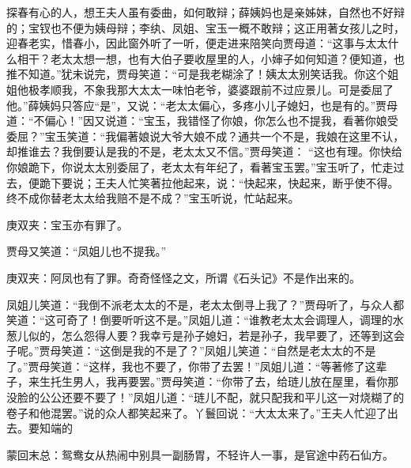 \begin{parag}
    探春有心的人，想王夫人虽有委曲，如何敢辩；薛姨妈也是亲姊妹，自然也不好辩的；宝钗也不便为姨母辩；李纨、凤姐、宝玉一概不敢辩；这正用著女孩儿之时，迎春老实，惜春小，因此窗外听了一听，便走进来陪笑向贾母道：“这事与太太什么相干？老太太想一想，也有大伯子要收屋里的人，小婶子如何知道？便知道，也推不知道。”犹未说完，贾母笑道：“可是我老糊涂了！姨太太别笑话我。你这个姐姐他极孝顺我，不象我那大太太一味怕老爷，婆婆跟前不过应景儿。可是委屈了他。”薛姨妈只答应“是”，又说：“老太太偏心，多疼小儿子媳妇，也是有的。”贾母道：“不偏心！”因又说道：“宝玉，我错怪了你娘，你怎么也不提我，看著你娘受委屈？”宝玉笑道：“我偏著娘说大爷大娘不成？通共一个不是，我娘在这里不认，却推谁去？我倒要认是我的不是，老太太又不信。”贾母笑道： “这也有理。你快给你娘跪下，你说太太别委屈了，老太太有年纪了，看著宝玉罢。”宝玉听了，忙走过去，便跪下要说；王夫人忙笑著拉他起来，说：“快起来，快起来，断乎使不得。终不成你替老太太给我赔不是不成？”宝玉听说，忙站起来。\begin{note}庚双夹：宝玉亦有罪了。\end{note}贾母又笑道：“凤姐儿也不提我。”\begin{note}庚双夹：阿凤也有了罪。奇奇怪怪之文，所谓《石头记》不是作出来的。\end{note}凤姐儿笑道：“我倒不派老太太的不是，老太太倒寻上我了？”贾母听了，与众人都笑道：“这可奇了！倒要听听这不是。”凤姐儿道：“谁教老太太会调理人，调理的水葱儿似的，怎么怨得人要？我幸亏是孙子媳妇，若是孙子，我早要了，还等到这会子呢。”贾母笑道：“这倒是我的不是了？”凤姐儿笑道：“自然是老太太的不是了。”贾母笑道：“这样，我也不要了，你带了去罢！”凤姐儿道：“等著修了这辈子，来生托生男人，我再要罢。”贾母笑道：“你带了去，给琏儿放在屋里，看你那没脸的公公还要不要了！”凤姐儿道：“琏儿不配，就只配我和平儿这一对烧糊了的卷子和他混罢。”说的众人都笑起来了。丫鬟回说：“大太太来了。”王夫人忙迎了出去。要知端的
\end{parag}


\begin{parag}
    \begin{note}蒙回末总：鸳鸯女从热闹中别具一副肠胃，不轻许人一事，是官途中药石仙方。\end{note}
\end{parag}

